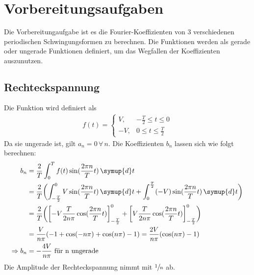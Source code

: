 \section{Vorbereitungsaufgaben}
Die Vorbereitungaufgabe ist es die Fourier-Koeffizienten von 3 verschiedenen periodischen Schwingungsformen zu berechnen.
Die Funktionen werden als gerade oder ungerade Funktionen definiert, um das Wegfallen der Koeffizienten auszunutzen.
\subsection{Rechteckspannung}
Die Funktion wird definiert als
\begin{align*}
    f(t) =
    \begin{cases}
        V, & -\frac{T}{2}  \leq t  \leq 0 \\
        -V, & 0  \leq t \leq \frac{T}{2}
    \end{cases}
\end{align*}
Da sie ungerade ist, gilt $a_n = 0  \, \forall \, n$.
Die Koeffizienten $b_n$ lassen sich wie folgt berechnen:
\begin{align*}
    b_n &= \frac{2}{T} \int_0^T f(t) \sin(\frac{2 \pi n}{T}t) \, \symup{d}t \\
        &= \frac{2}{T} \biggl( \int_{-\frac{T}{2}}^0 V \sin(\frac{2 \pi n}{T}t) \, \symup{d}t
                            + \int_{0}^{\frac{T}{2}} (-V) \sin(\frac{2 \pi n}{T}t) \, \symup{d}t \biggr) \\
        &= \frac{2}{T} \biggl( \left[-V \frac{T}{2n\pi} \cos(\frac{2 \pi n}{T}t) \right]_{-\frac{T}{2}}^0
                            + \left[V \frac{T}{2n\pi} \cos(\frac{2 \pi n}{T}t) \right]_{-\frac{T}{2}}^0 \biggr) \\
        &= \frac{V}{n\pi}(-1 + \cos(-n\pi)+ \cos(n\pi)-1) = \frac{2V}{n\pi} (\cos(n\pi)-1) \\
    \Rightarrow b_n &= - \frac{4V}{n\pi} \text{  für n ungerade}
\end{align*}
Die Amplitude der Rechteckspannung nimmt mit $\sfrac{1}{n}$ ab.
